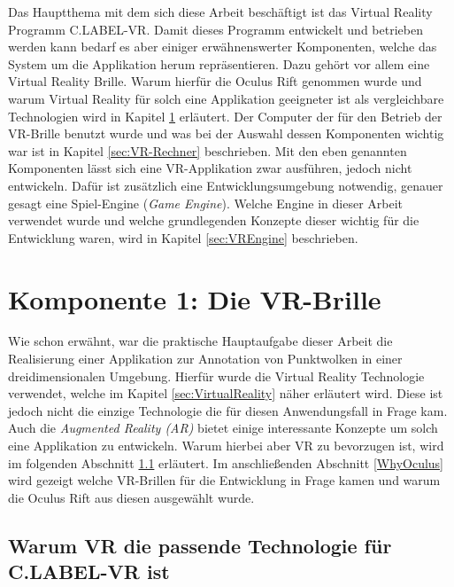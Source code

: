 \graphicspath{{Kapitel/Kapitel3_Systembeschreibung/Images/}}

Das Hauptthema mit dem sich diese Arbeit beschäftigt ist das Virtual Reality Programm C.LABEL-VR. Damit dieses Programm entwickelt und betrieben werden kann bedarf es aber einiger erwähnenswerter Komponenten, welche das System um die Applikation herum repräsentieren. Dazu gehört vor allem eine Virtual Reality Brille. Warum hierfür die Oculus Rift genommen wurde und warum Virtual Reality für solch eine Applikation geeigneter ist als vergleichbare Technologien wird in Kapitel \ref{sec:VRBrille} erläutert. Der Computer der für den Betrieb der VR-Brille benutzt wurde und was bei der Auswahl dessen Komponenten wichtig war ist in Kapitel \ref{sec:VR-Rechner} beschrieben. Mit den eben genannten Komponenten lässt sich eine VR-Applikation zwar ausführen, jedoch nicht entwickeln. Dafür ist zusätzlich eine Entwicklungsumgebung notwendig, genauer gesagt eine Spiel-Engine (\textit{Game Engine}). Welche Engine in dieser Arbeit verwendet wurde und welche grundlegenden Konzepte dieser wichtig für die Entwicklung waren, wird in Kapitel \ref{sec:VREngine} beschrieben. \cite{bib:VRKitchen}

\section{Komponente 1: Die VR-Brille}
\label{sec:VRBrille}

Wie schon erwähnt, war die praktische Hauptaufgabe dieser Arbeit die Realisierung einer Applikation zur Annotation von Punktwolken in einer dreidimensionalen Umgebung. Hierfür wurde die Virtual Reality Technologie verwendet, welche im Kapitel \ref{sec:VirtualReality} näher erläutert wird. Diese ist jedoch nicht die einzige Technologie die für diesen Anwendungsfall in Frage kam. Auch die \textit{Augmented Reality (AR)} bietet einige interessante Konzepte um solch eine Applikation zu entwickeln. Warum hierbei aber VR zu bevorzugen ist, wird im folgenden Abschnitt \ref{sec:WhyVR} erläutert. Im anschließenden Abschnitt \ref{WhyOculus} wird gezeigt welche VR-Brillen für die Entwicklung in Frage kamen und warum die Oculus Rift aus diesen ausgewählt wurde.

\subsection{Warum VR die passende Technologie für C.LABEL-VR ist}
\label{sec:WhyVR}

